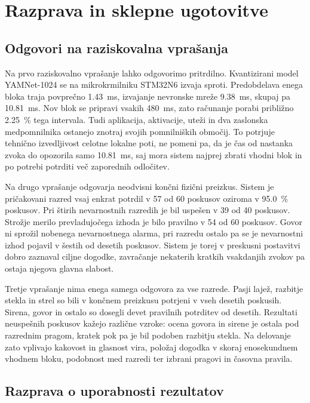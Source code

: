 \chapter{Razprava in sklepne ugotovitve}
\label{ch:razprava-sklep}

\section{Odgovori na raziskovalna vprašanja}

Na prvo raziskovalno vprašanje lahko odgovorimo pritrdilno. Kvantizirani model
YAMNet-1024 se na mikrokrmilniku STM32N6 izvaja sproti. Predobdelava enega
bloka traja povprečno \SI{1.43}{\milli\second}, izvajanje nevronske mreže
\SI{9.38}{\milli\second}, skupaj pa \SI{10.81}{\milli\second}. Nov blok se
pripravi vsakih \SI{480}{\milli\second}, zato računanje porabi približno
\SI{2.25}{\percent} tega intervala. Tudi aplikacija, aktivacije, uteži in dva
zaslonska medpomnilnika ostanejo znotraj svojih pomnilniških območij. To
potrjuje tehnično izvedljivost celotne lokalne poti, ne pomeni pa, da je čas od
nastanka zvoka do opozorila samo \SI{10.81}{\milli\second}, saj mora sistem
najprej zbrati vhodni blok in po potrebi potrditi več zaporednih odločitev.

Na drugo vprašanje odgovarja neodvisni končni fizični preizkus. Sistem je
pričakovani razred vsaj enkrat potrdil v 57 od 60 poskusov oziroma v
\SI{95.0}{\percent} poskusov. Pri štirih nevarnostnih razredih je bil uspešen
v 39 od 40 poskusov. Strožje merilo prevladujočega izhoda je bilo pravilno v
54 od 60 poskusov. Govor ni sprožil nobenega nevarnostnega alarma, pri razredu
ostalo pa se je nevarnostni izhod pojavil v šestih od desetih poskusov. Sistem
je torej v preskusni postavitvi dobro zaznaval ciljne dogodke, zavračanje
nekaterih kratkih vsakdanjih zvokov pa ostaja njegova glavna slabost.

Tretje vprašanje nima enega samega odgovora za vse razrede. Pasji lajež,
razbitje stekla in strel so bili v končnem preizkusu potrjeni v vseh desetih
poskusih. Sirena, govor in ostalo so dosegli devet pravilnih potrditev od
desetih. Rezultati neuspešnih poskusov kažejo različne vzroke: ocena govora in
sirene je ostala pod razrednim pragom, kratek pok pa je bil podoben razbitju
stekla. Na delovanje zato vplivajo kakovost in glasnost vira, položaj dogodka v
skoraj enosekundnem vhodnem bloku, podobnost med razredi ter izbrani pragovi in časovna
pravila.

\section{Razprava o uporabnosti rezultatov}

